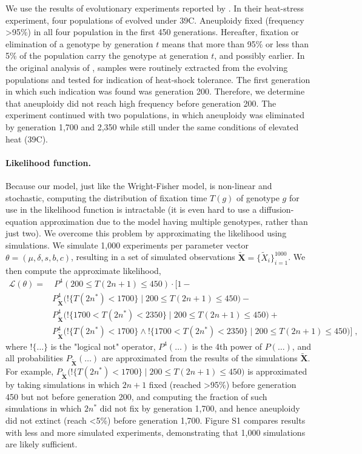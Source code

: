 \documentclass[12pt]{article}
\let\vec\mathbf
\newcommand{\likelihood}{\mathcal{L}}
\newcommand{\anwt}{\emph{$2n+1$}}
\newcommand{\eumt}{\emph{$2n^*$}}
\begin{document}
We use the results of evolutionary experiments reported by \citet{Yona2012}.
In their heat-stress experiment, four populations of \yeast evolved under 39\degree C. 
Aneuploidy fixed (frequency >95\%) in all four population in the first 450 generations. 
Hereafter, fixation or elimination of a genotype by generation $t$ means that more than 95\% or less than 5\% of the population carry the genotype at generation $t$, and possibly earlier. 
In the original analysis of \citet{Yona2012}, samples were routinely extracted from the evolving populations and tested for indication of heat-shock tolerance. The first generation in which such indication was found was generation 200. Therefore, we determine that aneuploidy did not reach high frequency before generation 200.
The experiment continued with two populations, in which aneuploidy was eliminated by generation 1,700 and 2,350 while still under the same conditions of elevated heat (39\degree C).

\paragraph{Likelihood function.} 
Because our model, just like the Wright-Fisher model, is non-linear and stochastic, computing the distribution of fixation time $T(g)$ of genotype $g$ for use in the likelihood function is intractable (it is even hard to use a diffusion-equation approximation due to the model having multiple genotypes, rather than just two).
We overcome this problem by approximating the likelihood using simulations. We simulate 1,000 experiments per parameter vector $\theta = (\mu, \delta, s, b, c)$, resulting in a set of simulated observations $\tilde{\vec X} = \{\tilde{X}_i\}_{i=1}^{1000}$. We then compute the approximate likelihood,
\begin{equation}\begin{aligned}
\label{eq:heatstress-likelihood}
\likelihood(\theta) = &\ P^4(200 \le T(2n+1) \le 450) \cdot 
	\Big[1 - \\
	&	P_{\tilde{\vec X}}^4\big(!\{T(2n^*)<1700\} \mid 200 \le T(2n+1) \le 450\big)- \\
	&	P_{\tilde{\vec X}}^4\big(!\{1700 < T(2n^*) < 2350\} \mid 200 \le T(2n+1) \le 450\big)+ \\
	&	P_{\tilde{\vec X}}^4\big(!\{T(2n^*)<1700\} \land !\{1700 < T(2n^*) < 2350\} \mid 200 \le T(2n+1) \le 450\big) 
	\Big]\;,
\end{aligned}\end{equation}
where $!\{\ldots\}$ is the "logical not" operator, $P^4(\ldots)$ is the 4th power of $P(\ldots)$, and all probabilities $P_{\tilde{\vec X}}(\ldots)$ are approximated from the results of the simulations $\tilde{\vec X}$. For example, $P_{\tilde{\vec X}}\big(!\{T(2n^*)<1700\} \mid 200 \le T(2n+1) \le 450\big)$ is approximated by taking simulations in which \anwt\; fixed (reached >95\%) before generation 450 but not before generation 200, and computing the fraction of such simulations in which \eumt\; did not fix by generation 1,700, and hence aneuploidy did not extinct (reach <5\%) before generation 1,700.
Figure S1 compares results with less and more simulated experiments, demonstrating that 1,000 simulations are likely sufficient.
 
\end{document}
